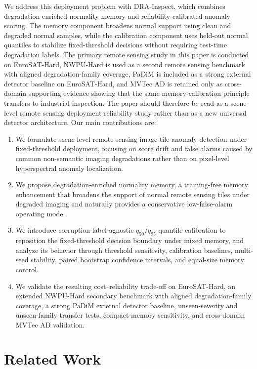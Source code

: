 \documentclass[remotesensing,article,submit,pdftex,moreauthors]{Definitions/mdpi}
\begin{document}
We address this deployment problem with DRA-Inspect, which combines degradation-enriched normality memory and reliability-calibrated anomaly scoring. The memory component broadens normal support using clean and degraded normal samples, while the calibration component uses held-out normal quantiles to stabilize fixed-threshold decisions without requiring test-time degradation labels. The primary remote sensing study in this paper is conducted on EuroSAT-Hard, NWPU-Hard is used as a second remote sensing benchmark with aligned degradation-family coverage, PaDiM is included as a strong external detector baseline on EuroSAT-Hard, and MVTec AD is retained only as cross-domain supporting evidence showing that the same memory-calibration principle transfers to industrial inspection. The paper should therefore be read as a scene-level remote sensing deployment reliability study rather than as a new universal detector architecture. Our main contributions are:

\begin{enumerate}
\item We formulate scene-level remote sensing image-tile anomaly detection under fixed-threshold deployment, focusing on score drift and false alarms caused by common non-semantic imaging degradations rather than on pixel-level hyperspectral anomaly localization.
\item We propose degradation-enriched normality memory, a training-free memory enhancement that broadens the support of normal remote sensing tiles under degraded imaging and naturally provides a conservative low-false-alarm operating mode.
\item We introduce corruption-label-agnostic $q_{50}/q_{95}$ quantile calibration to reposition the fixed-threshold decision boundary under mixed memory, and analyze its behavior through threshold sensitivity, calibration baselines, multi-seed stability, paired bootstrap confidence intervals, and equal-size memory control.
\item We validate the resulting cost--reliability trade-off on EuroSAT-Hard, an extended NWPU-Hard secondary benchmark with aligned degradation-family coverage, a strong PaDiM external detector baseline, unseen-severity and unseen-family transfer tests, compact-memory sensitivity, and cross-domain MVTec AD validation.
\end{enumerate}

\section{Related Work}
\end{document}
